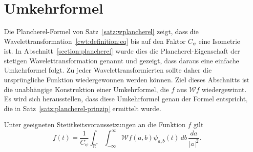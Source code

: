 %
%
%
\section{Umkehrformel%
\label{section:cwt:umkehrformel}}
Die Plancherel-Formel von Satz~\ref{satz:wplancherel} zeigt, dass die
Wavelettransformation~\eqref{cwt:definition:eq} bis auf den Faktor
$C_{\psi}$ eine Isometrie ist.
In Abschnitt~\ref{section:plancherel} wurde dies die Plancherel-Eigenschaft
der stetigen Wavelettransformation genannt und gezeigt, dass daraus
eine einfache Umkehrformel folgt.
Zu jeder Wavelettransformierten sollte daher die ursprüngliche
Funktion wiedergewonnen werden können.
Ziel dieses Abschnitts ist die unabhängige Konstruktion einer Umkehrformel, 
die $f$ aus $\mathcal{W}f$ wiedergewinnt.
Es wird sich herausstellen, dass diese Umkehrformel genau der Formel
entspricht, die in Satz~\ref{satz:plancherel-prinzip} ermittelt wurde.

\begin{satz}
Unter geeigneten Stetitkeitsvoraussetzungen an die Funktion $f$ gilt
\begin{equation}
f(t) = \frac{1}{C_{\psi}}\int_{\mathbb R^*}\int_{-\infty}^\infty
\mathcal{W}f(a,b) \psi_{a,b}(t)
\,db\,\frac{da}{|a|^2}.
\label{cwt:umkehr}
\end{equation}
\end{satz}

